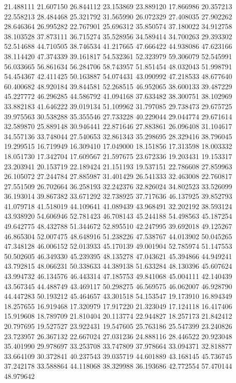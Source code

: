 21.488111
21.607150
26.844112
23.153869
23.889120
17.866986
20.357213
22.558213
28.484468
25.321792
31.565990
26.072329
27.408035
27.902262
28.646364
26.995282
22.767901
25.696312
35.850574
37.180022
34.912758
38.103528
37.873111
36.715274
35.528956
34.589414
34.700263
29.393302
52.514688
44.710505
38.746534
41.217665
47.666422
44.938086
47.623166
38.114420
47.374339
39.161817
54.532361
52.323979
59.306079
52.545991
56.033665
56.861634
56.284706
58.743957
51.851454
48.032043
51.998791
54.454367
42.411425
50.163887
54.074431
43.090992
47.218533
48.677640
60.400682
48.920184
39.844581
52.268515
46.952065
38.600133
39.487229
45.227772
46.296285
44.586792
41.094168
37.633482
38.300751
38.102969
33.882183
41.646222
39.019134
51.109962
31.797085
29.738473
29.675725
39.975563
30.538288
35.355546
27.733228
40.229044
29.044774
29.671614
32.589870
25.889148
30.946441
22.871646
27.883861
26.096408
31.104617
34.557136
33.748044
27.540653
32.861343
35.298695
28.329416
38.796045
19.299515
16.719949
16.309410
17.049000
18.151856
17.313598
18.003332
18.051730
17.342704
17.609567
21.597675
23.672336
19.203431
19.153317
23.203941
20.153719
22.189424
21.151193
19.537151
22.786608
27.859963
26.105072
27.244784
27.885987
31.401429
26.541333
32.463008
22.760817
27.551509
26.702664
36.258193
32.242376
32.826024
34.802523
33.526099
36.193014
39.867382
33.671292
32.738925
37.717636
46.137925
39.852793
41.079718
41.518019
44.109641
41.089439
43.968491
32.202192
38.593124
43.938920
54.606946
52.781423
46.708143
45.244188
54.498563
45.187254
49.642775
48.432788
51.344672
52.895510
42.247995
39.692018
49.125267
46.865304
52.007475
48.648916
51.238226
47.538767
44.013902
50.045265
47.348128
46.006152
52.013933
45.170139
49.001904
52.785974
51.147553
50.502605
46.349330
45.239395
48.135278
47.043621
45.394866
44.949241
43.792815
48.066231
50.338633
44.389138
51.633284
48.130396
45.607624
43.994732
46.134576
46.443314
47.185753
49.841068
45.004111
42.140439
43.567345
44.488749
43.469117
50.298275
46.569575
46.062007
46.928790
44.447283
50.193212
45.464657
43.301518
54.153547
19.173910
16.894349
18.257655
16.919468
17.320979
17.917220
21.323049
17.124118
16.417406
15.919608
18.789709
21.810404
20.113774
22.944827
18.257173
21.842412
20.797695
19.527527
23.922431
19.547605
25.763186
25.547399
23.240826
23.723957
26.367132
22.667024
27.031236
24.888116
28.446522
20.923048
35.401990
29.978697
33.253708
33.747809
37.978664
33.094371
32.818877
33.664109
30.372841
40.237543
39.035719
44.601889
43.168145
45.736745
37.242178
33.588864
44.118068
38.329988
36.193686
42.772554
57.470144
48.979642
